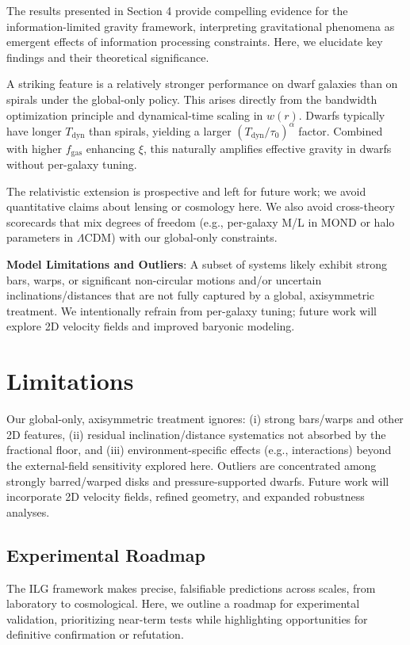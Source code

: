 \documentclass[12pt,a4paper]{article}
\begin{document}
The results presented in Section 4 provide compelling evidence for the information-limited gravity framework, interpreting gravitational phenomena as emergent effects of information processing constraints. Here, we elucidate key findings and their theoretical significance.

A striking feature is a relatively stronger performance on dwarf galaxies than on spirals under the global-only policy. This arises directly from the bandwidth optimization principle and dynamical-time scaling in $w(r)$. Dwarfs typically have longer $T_\mathrm{dyn}$ than spirals, yielding a larger $(T_\mathrm{dyn}/\tau_0)^\alpha$ factor. Combined with higher $f_\mathrm{gas}$ enhancing $\xi$, this naturally amplifies effective gravity in dwarfs without per-galaxy tuning.

The relativistic extension is prospective and left for future work; we avoid quantitative claims about lensing or cosmology here. We also avoid cross-theory scorecards that mix degrees of freedom (e.g., per-galaxy M/L in MOND or halo parameters in $\Lambda$CDM) with our global-only constraints.

\textbf{Model Limitations and Outliers}: A subset of systems likely exhibit strong bars, warps, or significant non-circular motions and/or uncertain inclinations/distances that are not fully captured by a global, axisymmetric treatment. We intentionally refrain from per-galaxy tuning; future work will explore 2D velocity fields and improved baryonic modeling.

\section{Limitations}
\noindent Our global-only, axisymmetric treatment ignores: (i) strong bars/warps and other 2D features, (ii) residual inclination/distance systematics not absorbed by the fractional floor, and (iii) environment-specific effects (e.g., interactions) beyond the external-field sensitivity explored here. Outliers are concentrated among strongly barred/warped disks and pressure-supported dwarfs. Future work will incorporate 2D velocity fields, refined geometry, and expanded robustness analyses.

\subsection{Experimental Roadmap}

The ILG framework makes precise, falsifiable predictions across scales, from laboratory to cosmological. Here, we outline a roadmap for experimental validation, prioritizing near-term tests while highlighting opportunities for definitive confirmation or refutation.
\end{document}
